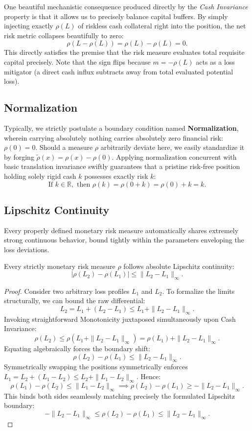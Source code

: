 One beautiful mechanistic consequence produced directly by the \textit{Cash Invariance} property is that it allows us to precisely balance capital buffers. By simply injecting exactly $\rho(L)$ of riskless cash collateral right into the position, the net risk metric collapses beautifully to zero:
$$
\rho(L - \rho(L)) = \rho(L) - \rho(L) = 0.
$$
This directly satisfies the premise that the risk measure evaluates total requisite capital precisely. Note that the sign flips because $m = -\rho(L)$ acts as a loss mitigator (a direct cash influx subtracts away from total evaluated potential loss).

\subsection{Normalization}

Typically, we strictly postulate a boundary condition named \textbf{Normalization}, wherein carrying absolutely nothing carries absolutely zero financial risk: $\rho(0) = 0$.
Should a measure $\rho$ arbitrarily deviate here, we easily standardize it by forging $\tilde{\rho}(x) = \rho(x) - \rho(0)$. Applying normalization concurrent with basic translation invariance swiftly guarantees that a pristine risk-free position holding solely rigid cash $k$ possesses exactly risk $k$:
$$
\text{If } k \in \mathbb{R}, \text{ then } \rho(k) = \rho(0 + k) = \rho(0) + k = k.
$$

\subsection{Lipschitz Continuity}

Every properly defined monetary risk measure automatically shares extremely strong continuous behavior, bound tightly within the parameters enveloping the loss deviations.

\begin{proposition}
Every strictly monetary risk measure $\rho$ follows absolute Lipschitz continuity:
$$
|\rho(L_2) - \rho(L_1)| \leq \|L_2 - L_1\|_\infty.
$$
\end{proposition}

\begin{proof}
Consider two arbitrary loss profiles $L_1$ and $L_2$. To formalize the limits structurally, we can bound the raw differential:
$$
L_2 = L_1 + (L_2 - L_1) \leq L_1 + \|L_2 - L_1\|_\infty.
$$
Invoking straightforward Monotonicity juxtaposed simultaneously upon Cash Invariance:
$$
\rho(L_2) \leq \rho(L_1 + \|L_2 - L_1\|_\infty) = \rho(L_1) + \|L_2 - L_1\|_\infty.
$$
Equating algebraically forces the boundary shift:
$$
\rho(L_2) - \rho(L_1) \leq \|L_2 - L_1\|_\infty.
$$
Symmetrically swapping the positions symmetrically enforces $L_1 = L_2 + (L_1 - L_2) \leq L_2 + \|L_1 - L_2\|_\infty$. Hence:
$$
\rho(L_1) - \rho(L_2) \leq \|L_1 - L_2\|_\infty \implies \rho(L_2) - \rho(L_1) \geq -\|L_2 - L_1\|_\infty.
$$
This binds both sides seamlessly matching precisely the formulated Lipschitz boundary:
$$
-\|L_2 - L_1\|_\infty \leq \rho(L_2) - \rho(L_1) \leq \|L_2 - L_1\|_\infty.
$$
\end{proof}


